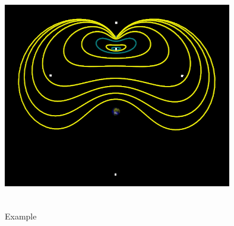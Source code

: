 \begin{figure}[!htmb]
        \centering
		\includegraphics[width=10cm, height=10cm] {./include/emL1Sol}
        \caption{Example} \label{fig:AppEx1}
\end{figure}
